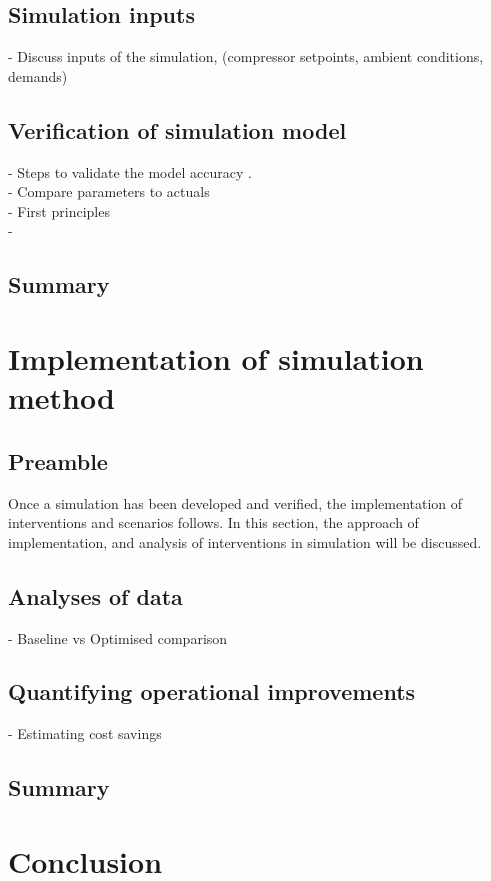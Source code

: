 	\subsection{Simulation inputs}
		- Discuss inputs of the simulation, (compressor setpoints, ambient conditions, demands)
	\subsection{Verification of simulation model}
		- Steps to validate  the model accuracy .\\
		- Compare parameters to actuals\\
		- First principles\\
		-
	\subsection{Summary}
\section{Implementation of simulation method}
	\subsection{Preamble}
		Once a simulation has been developed and verified, the implementation of interventions and scenarios follows. In this section, the approach of implementation, and analysis of interventions in simulation will be discussed.
	\subsection{Analyses of data}
		- Baseline vs Optimised comparison \\
	\subsection{Quantifying operational improvements}
		- Estimating cost savings
	\subsection{Summary}
\section{Conclusion}
